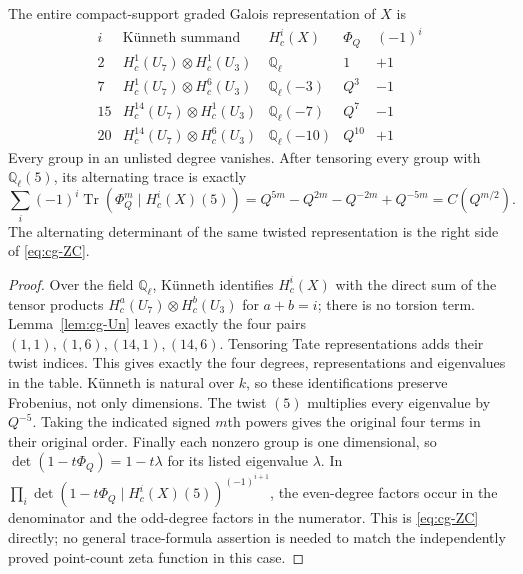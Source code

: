 \begin{theorem}\label{thm:cg-fullFrob}
The entire compact-support graded Galois representation of $X$ is
\[
\begin{array}{c|c|c|c|c}
 i&\text{K\"unneth summand}&H^i_c(X)&\Phi_Q&(-1)^i\\\hline
 2&H^1_c(U_7)\otimes H^1_c(U_3)&\mathbb Q_\ell&1&+1\\
 7&H^1_c(U_7)\otimes H^6_c(U_3)&\mathbb Q_\ell(-3)&Q^3&-1\\
 15&H^{14}_c(U_7)\otimes H^1_c(U_3)&\mathbb Q_\ell(-7)&Q^7&-1\\
 20&H^{14}_c(U_7)\otimes H^6_c(U_3)&\mathbb Q_\ell(-10)&Q^{10}&+1
\end{array}
\]
Every group in an unlisted degree vanishes. After tensoring every
group with $\mathbb Q_\ell(5)$, its alternating trace is exactly
\[
 \sum_i(-1)^i\operatorname{Tr}
 \left(\Phi_Q^m\mid H^i_c(X)(5)\right)
 =Q^{5m}-Q^{2m}-Q^{-2m}+Q^{-5m}=C(Q^{m/2}).
\]
The alternating determinant of the same twisted representation is
the right side of \eqref{eq:cg-ZC}.
\end{theorem}
\begin{proof}
Over the field $\mathbb Q_\ell$, K\"unneth identifies $H^i_c(X)$
with the direct sum of the tensor products $H^a_c(U_7)\otimes H^b_c(U_3)$
for $a+b=i$; there is no torsion term. Lemma~\ref{lem:cg-Un} leaves
exactly the four pairs $(1,1),(1,6),(14,1),(14,6)$. Tensoring Tate
representations adds their twist indices. This gives exactly the four
degrees, representations and eigenvalues in the table. K\"unneth is
natural over $k$, so these identifications preserve Frobenius, not only
dimensions. The twist $(5)$ multiplies every eigenvalue by $Q^{-5}$.
Taking the indicated signed $m$th powers gives the original four terms
in their original order. Finally each nonzero group is one dimensional,
so $\det(1-t\Phi_Q)=1-t\lambda$ for its listed eigenvalue $\lambda$.
In $\prod_i\det(1-t\Phi_Q\mid H^i_c(X)(5))^{(-1)^{i+1}}$,
the even-degree factors occur in the denominator and the odd-degree
factors in the numerator. This is \eqref{eq:cg-ZC} directly; no
general trace-formula assertion is needed to match the independently
proved point-count zeta function in this case.
\end{proof}

